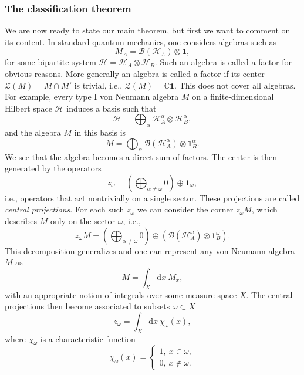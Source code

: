 \documentclass[aps,pra,reprint,superscriptaddress]{revtex4-2}
\newcommand{\bbC}{\mathbb C}
\newcommand{\cB}{{\mathcal B}}
\newcommand{\cH}{{\mathcal H}}
\newcommand{\cZ}{{\mathcal Z}}
\renewcommand\a{\alpha}
\newcommand\w{\omega}
\newcommand{\id}{\mathbf 1}
\theoremstyle{definition}
\theoremstyle{remark}
\begin{document}
\subsubsection{The classification theorem}
We are now ready to state our main theorem, but first we want to comment on its content.
In standard quantum mechanics, one considers algebras such as 
\begin{equation}
    M_A = \cB(\cH_A) \otimes \id,
\end{equation}
for some bipartite system $\cH = \cH_A \otimes \cH_B$. Such an algebra is called a factor for obvious reasons. More generally an algebra is called a factor if its center  $\cZ(M) = M \cap M'$ is trivial, i.e., $\cZ(M) = \bbC \id$. This does not cover all algebras. For example, every type I von Neumann algebra $M$ on a finite-dimensional Hilbert space $\cH$ induces a basis such that 
\begin{equation}
    \cH = \bigoplus_\a \cH^{\a}_A \otimes \cH^{\a}_B,
\end{equation}
and the algebra $M$ in this basis is 
\begin{equation}\label{eq:central-decomp}
    M = \bigoplus_\a \cB(\cH^{\a}_A) \otimes \id^\a_B.
\end{equation}
We see that the algebra becomes a direct sum of factors. 
The center is then generated by the operators
\begin{equation}
    z_\w =  \left( \bigoplus_{\a \neq \w} 0 \right) \oplus \id_\w,
\end{equation}
i.e., operators that  act nontrivially on a single sector. These projections are called \emph{central projections}.
For each such $z_\w$ we can consider the corner $z_\w M$, which describes $M$ only on the sector $\w$, i.e., 
\begin{equation}
   z_\w M  =  \left( \bigoplus_{\a \neq \w} 0 \right) \oplus \left( \cB(\cH^\w_A ) \otimes \id^\w_B \right).
\end{equation}
This decomposition generalizes and one can represent any von Neumann algebra $M$ as 
\begin{equation}
    M = \int_X \mathrm{d} x\ M_x,
\end{equation}
with an appropriate notion of integrals over some measure space $X$. The central projections then become associated to subsets $\w \subset X$
\begin{equation}
    z_\w = \int_X \mathrm{d}x\ \chi_\w(x),
\end{equation}
where $\chi_\w$ is a characteristic function
\begin{equation}
    \chi_\w(x) = \begin{cases}
        1,\ x \in \w, \\
        0,\ x \notin \w.
    \end{cases}
\end{equation}
\end{document}
